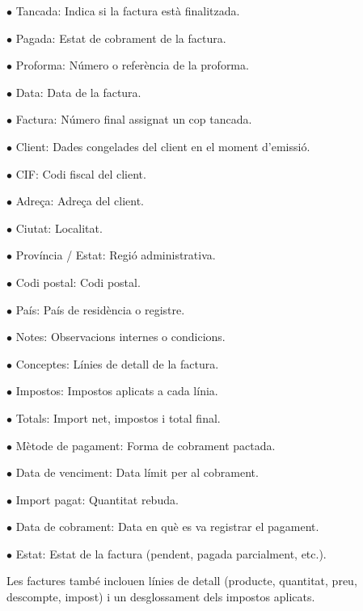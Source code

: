 \documentclass[a4paper]{article}
\begin{document}
\begin{compactitem}
\item[\color{myblue}$\bullet$] Tancada: Indica si la factura està finalitzada.
\item[\color{myblue}$\bullet$] Pagada: Estat de cobrament de la factura.
\item[\color{myblue}$\bullet$] Proforma: Número o referència de la proforma.
\item[\color{myblue}$\bullet$] Data: Data de la factura.
\item[\color{myblue}$\bullet$] Factura: Número final assignat un cop tancada.
\item[\color{myblue}$\bullet$] Client: Dades congelades del client en el moment d'emissió.
\item[\color{myblue}$\bullet$] CIF: Codi fiscal del client.
\item[\color{myblue}$\bullet$] Adreça: Adreça del client.
\item[\color{myblue}$\bullet$] Ciutat: Localitat.
\item[\color{myblue}$\bullet$] Província / Estat: Regió administrativa.
\item[\color{myblue}$\bullet$] Codi postal: Codi postal.
\item[\color{myblue}$\bullet$] País: País de residència o registre.
\item[\color{myblue}$\bullet$] Notes: Observacions internes o condicions.
\item[\color{myblue}$\bullet$] Conceptes: Línies de detall de la factura.
\item[\color{myblue}$\bullet$] Impostos: Impostos aplicats a cada línia.
\item[\color{myblue}$\bullet$] Totals: Import net, impostos i total final.
\item[\color{myblue}$\bullet$] Mètode de pagament: Forma de cobrament pactada.
\item[\color{myblue}$\bullet$] Data de venciment: Data límit per al cobrament.
\item[\color{myblue}$\bullet$] Import pagat: Quantitat rebuda.
\item[\color{myblue}$\bullet$] Data de cobrament: Data en què es va registrar el pagament.
\item[\color{myblue}$\bullet$] Estat: Estat de la factura (pendent, pagada parcialment, etc.).
\end{compactitem}

Les factures també inclouen línies de detall (producte, quantitat, preu, descompte, impost) i un desglossament dels impostos aplicats.
\end{document}
